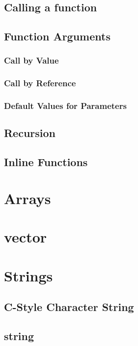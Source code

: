 \documentclass[10pt,a4paper]{scrartcl}
\begin{document}
\begin{multicols*}{2}
\subsection{Calling a function}

\subsection{Function Arguments}

\subsubsection{Call by Value}

\subsubsection{Call by Reference}

\subsubsection{Default Values for Parameters}

\subsection{Recursion}

\subsection{Inline Functions}

\section{Arrays}

\section{vector}

\section{Strings}

\subsection{C-Style Character String}

\subsection{string}


\end{multicols*}
\end{document}
